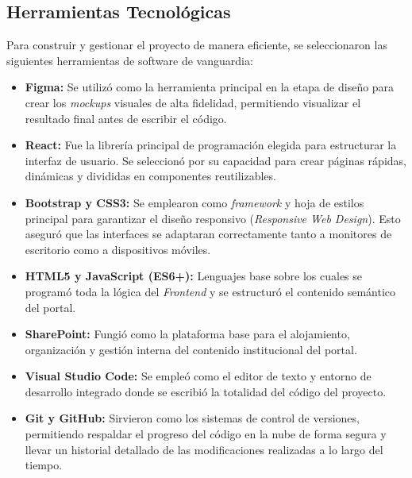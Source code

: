 \subsection{Herramientas Tecnológicas}
Para construir y gestionar el proyecto de manera eficiente, se seleccionaron las siguientes herramientas de software de vanguardia:

\begin{itemize}
    \item \textbf{Figma:} Se utilizó como la herramienta principal en la etapa de diseño para crear los \textit{mockups} visuales de alta fidelidad, permitiendo visualizar el resultado final antes de escribir el código.
    \item \textbf{React:} Fue la librería principal de programación elegida para estructurar la interfaz de usuario. Se seleccionó por su capacidad para crear páginas rápidas, dinámicas y divididas en componentes reutilizables.
    \item \textbf{Bootstrap y CSS3:} Se emplearon como \textit{framework} y hoja de estilos principal para garantizar el diseño responsivo (\textit{Responsive Web Design}). Esto aseguró que las interfaces se adaptaran correctamente tanto a monitores de escritorio como a dispositivos móviles.
    \item \textbf{HTML5 y JavaScript (ES6+):} Lenguajes base sobre los cuales se programó toda la lógica del \textit{Frontend} y se estructuró el contenido semántico del portal.
    \item \textbf{SharePoint:} Fungió como la plataforma base para el alojamiento, organización y gestión interna del contenido institucional del portal.
    \item \textbf{Visual Studio Code:} Se empleó como el editor de texto y entorno de desarrollo integrado donde se escribió la totalidad del código del proyecto.
    \item \textbf{Git y GitHub:} Sirvieron como los sistemas de control de versiones, permitiendo respaldar el progreso del código en la nube de forma segura y llevar un historial detallado de las modificaciones realizadas a lo largo del tiempo.
\end{itemize}
